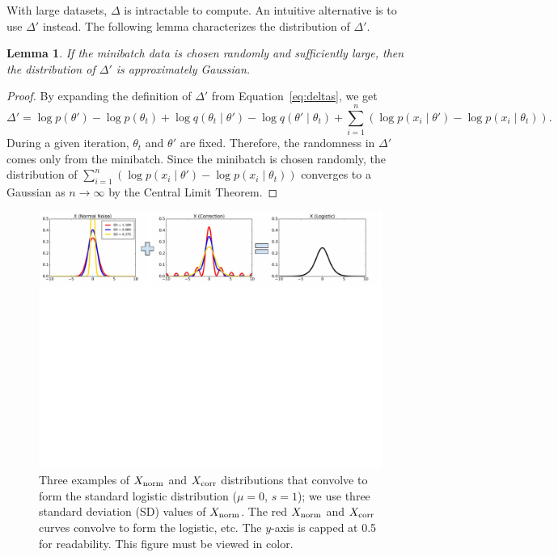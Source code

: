 \documentclass{article}
\newtheorem{lemma}{Lemma}
\begin{document}
With large datasets, $\Delta$ is intractable to compute. An intuitive alternative is to use
$\Delta'$ instead. The following lemma characterizes the distribution of $\Delta'$.

\begin{lemma}\label{lem:gaussian}
If the minibatch data is chosen randomly and sufficiently large, then the distribution of $\Delta'$ is approximately Gaussian.
\end{lemma}

\begin{proof}
By expanding the definition of $\Delta'$ from Equation~\ref{eq:deltas}, we get
\[
\Delta' = \log p(\theta') - \log p(\theta_t) + \log q(\theta_t \mid \theta') - \log q(\theta' \mid \theta_t) +
\sum_{i=1}^n (\log p(x_i\mid \theta') - \log p(x_i\mid \theta_t)).
\]
During a given iteration, $\theta_t$ and $\theta'$ are fixed. Therefore, the randomness in $\Delta'$
comes only from the minibatch. Since the minibatch is chosen randomly, the distribution of
$\sum_{i=1}^n (\log p(x_i\mid \theta') - \log p(x_i\mid \theta_t))$ converges to a Gaussian as $n
\to \infty$ by the Central Limit Theorem.
\end{proof}

\begin{figure}[t]
    \centering
    \includegraphics[width=1\textwidth]{mh_convolution_diagram_v2}
    \caption{
    Three examples of $X_{\rm norm}$ and $X_{\rm corr}$ distributions that convolve to form the
    standard logistic distribution ($\mu=0$, $s=1$); we use three standard deviation (SD) values of
    $X_{\rm norm}$. The red $X_{\rm norm}$ and $X_{\rm corr}$ curves convolve to form the logistic,
    etc. The $y$-axis is capped at 0.5 for readability. This figure must be viewed in color.
    }
    \label{fig:deconvolution}
    \vspace{-10pt}
\end{figure}
\end{document}
